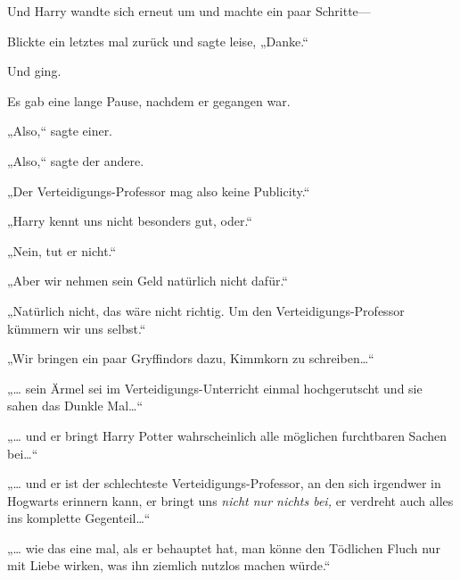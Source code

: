 Und Harry wandte sich erneut um und machte ein paar Schritte—

Blickte ein letztes mal zurück und sagte leise, „Danke.“

Und ging.

Es gab eine lange Pause, nachdem er gegangen war.

„Also,“ sagte einer.

„Also,“ sagte der andere.

„Der Verteidigungs-Professor mag also keine Publicity.“

„Harry kennt uns nicht besonders gut, oder.“

„Nein, tut er nicht.“

„Aber wir nehmen sein Geld natürlich nicht dafür.“

„Natürlich nicht, das wäre nicht richtig. Um den Verteidigungs-Professor kümmern wir uns selbst.“

„Wir bringen ein paar Gryffindors dazu, Kimmkorn zu schreiben…“

„… sein Ärmel sei im Verteidigungs-Unterricht einmal hochgerutscht und sie sahen das Dunkle Mal…“

„… und er bringt Harry Potter wahrscheinlich alle möglichen furchtbaren Sachen bei…“

„… und er ist der schlechteste Verteidigungs-Professor, an den sich irgendwer in Hogwarts erinnern kann, er bringt uns \emph{nicht nur nichts bei,} er verdreht auch alles ins komplette Gegenteil…“

„… wie das eine mal, als er behauptet hat, man könne den Tödlichen Fluch nur mit Liebe wirken, was ihn ziemlich nutzlos machen würde.“

